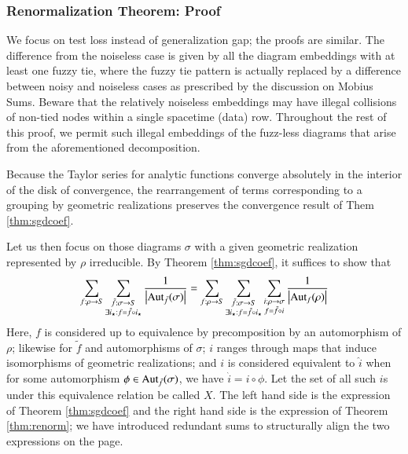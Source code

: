 \documentclass{article}
\theoremstyle{plain}
\theoremstyle{definition}
\newcommand{\Aut}{\text{\textnormal{Aut}}}
\newcommand{\wabs}[1]{\left|#1\right|}
\begin{document}
        \subsubsection*{Renormalization Theorem: Proof}
            We focus on test loss instead of generalization gap; the proofs are
            similar. The
            difference from the noiseless case is given by all the diagram
            embeddings with at least one fuzzy tie, where the fuzzy tie pattern
            is actually replaced by a difference between noisy and noiseless
            cases as prescribed by the discussion on Mobius Sums.
            Beware that the relatively noiseless embeddings may have illegal
            collisions of non-tied nodes within a single spacetime (data) row.
            Throughout the rest of this proof, we permit such illegal
            embeddings of the fuzz-less diagrams that arise from the
            aforementioned decomposition.  

            Because the Taylor series for analytic functions converge
            absolutely in the interior of the disk of convergence, the
            rearrangement of terms corresponding to a grouping by geometric
            realizations preserves the convergence result of Them
            \ref{thm:sgdcoef}.  

            Let us then focus on those diagrams $\sigma$ with a given geometric
            realization represented by $\rho$ irreducible.  By Theorem
            \ref{thm:sgdcoef}, it suffices to show that
            \begin{equation} \label{eq:hard}
                \sum_{f:\rho\to S}
                \sum_{\substack{
                    \tilde f:\sigma\to S \\
                    \exists i_\star: f=\tilde f \circ i_\star
                }}
                \frac{1}{\wabs{\Aut_{\tilde f}(\sigma)}}
                =
                \sum_{f:\rho\to S}
                \sum_{\substack{
                    \tilde f:\sigma\to S \\
                    \exists i_\star: f=\tilde f \circ i_\star
                }}
                \sum_{\substack{
                    i:\rho\to\sigma \\
                    f = \tilde f \circ i
                }}
                \frac{1}{\wabs{\Aut_{f}(\rho)}}
            \end{equation}
            Here, $f$ is considered up to equivalence by precomposition by an
            automorphism of $\rho$; likewise for $\tilde f$ and automorphisms
            of $\sigma$; $i$ ranges through maps that induce isomorphisms of
            geometric realizations; and $i$ is considered equivalent to $\hat
            i$ when for some automorphism $\phi \in \Aut_{\tilde f}(\sigma)$,
            we have $\hat i = i \circ \phi$.  Let the set of all such $i$s
            under this equivalence relation be called $X$.  The left hand side
            is the expression of Theorem \ref{thm:sgdcoef} and the right hand
            side is the expression of Theorem \ref{thm:renorm}; we have
            introduced redundant sums to structurally align the two expressions
            on the page.
\end{document}
